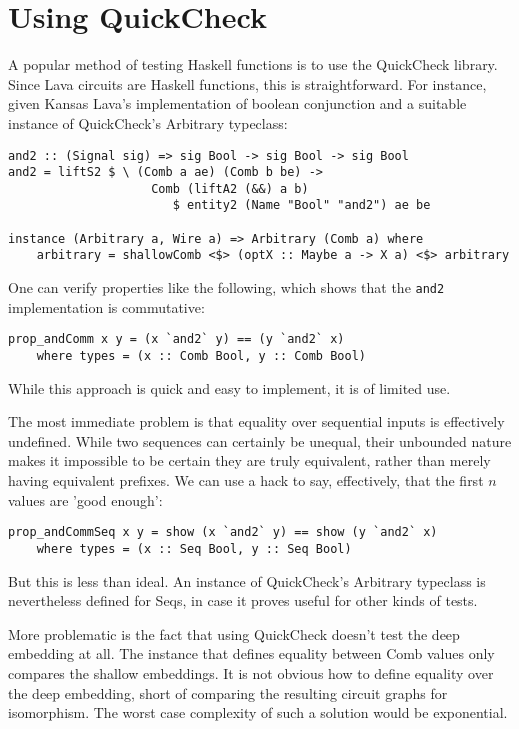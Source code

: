 \documentclass{llncs}
\begin{document}
\section{Using QuickCheck}

A popular method of testing Haskell functions is to use the QuickCheck library.
Since Lava circuits are Haskell functions, this is straightforward.
For instance, given Kansas Lava's implementation of boolean conjunction and
a suitable instance of QuickCheck's Arbitrary typeclass:

\begin{verbatim}
and2 :: (Signal sig) => sig Bool -> sig Bool -> sig Bool
and2 = liftS2 $ \ (Comb a ae) (Comb b be) ->
                    Comb (liftA2 (&&) a b)
                       $ entity2 (Name "Bool" "and2") ae be

instance (Arbitrary a, Wire a) => Arbitrary (Comb a) where
    arbitrary = shallowComb <$> (optX :: Maybe a -> X a) <$> arbitrary
\end{verbatim}

One can verify properties like the following, which shows that the
\verb|and2| implementation is commutative:

\begin{verbatim}
prop_andComm x y = (x `and2` y) == (y `and2` x)
    where types = (x :: Comb Bool, y :: Comb Bool)
\end{verbatim}

While this approach is quick and easy to implement, it is of
limited use.

The most immediate problem is that equality over sequential
inputs is effectively undefined. While two sequences can certainly
be unequal, their unbounded nature makes it impossible to be
certain they are truly equivalent, rather than merely having
equivalent prefixes. We can use a hack to say, effectively, that
the first $n$ values are 'good enough':

\begin{verbatim}
prop_andCommSeq x y = show (x `and2` y) == show (y `and2` x)
    where types = (x :: Seq Bool, y :: Seq Bool)
\end{verbatim}

But this is less than ideal. An instance of QuickCheck's Arbitrary
typeclass is nevertheless defined for Seqs, in case it proves
useful for other kinds of tests.

More problematic is the fact that using QuickCheck doesn't test the deep
embedding at all. The instance that defines equality between
Comb values only compares the shallow embeddings. It is
not obvious how to define equality over the deep embedding,
short of comparing the resulting circuit graphs for isomorphism.
The worst case complexity of such a solution would be exponential.
\end{document}

